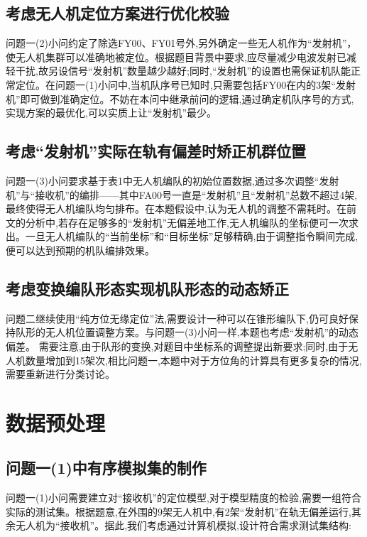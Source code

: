 \documentclass[withoutpreface,bwprint]{cumcmthesis}
\begin{document}
	\subsection{考虑无人机定位方案进行优化校验}
	
	问题一(2)小问约定了除选FY00、FY01号外,另外确定一些无人机作为“发射机”，使无人机集群可以准确地被定位。根据题目背景中要求,应尽量减少电波发射已减轻干扰,故另设信号“发射机”数量越少越好;同时,“发射机”的设置也需保证机队能正常定位。在问题一(1)小问中,当机队序号已知时,只需要包括FY00在内的3架“发射机”即可做到准确定位。不妨在本问中继承前问的逻辑,通过确定机队序号的方式,实现方案的最优化,可以实质上让“发射机”最少。
	
	\subsection{考虑“发射机”实际在轨有偏差时矫正机群位置}
	
	问题一(3)小问要求基于表1中无人机编队的初始位置数据,通过多次调整“发射机”与“接收机”的编排——其中FA00号一直是“发射机”且“发射机”总数不超过4架,最终使得无人机编队均匀排布。在本题假设中,认为无人机的调整不需耗时。在前文的分析中,若存在足够多的“发射机”无偏差地工作,无人机编队的坐标便可一次求出。一旦无人机编队的“当前坐标”和“目标坐标”足够精确,由于调整指令瞬间完成,便可以达到预期的机队编排效果。
	
	
	\subsection{考虑变换编队形态实现机队形态的动态矫正}
	
	问题二继续使用“纯方位无缘定位”法,需要设计一种可以在锥形编队下,仍可良好保持队形的无人机位置调整方案。与问题一(3)小问一样,本题也考虑“发射机”的动态偏差。%
	需要注意,由于队形的变换,对题目中坐标系的调整提出新要求;同时,由于无人机数量增加到15架次,相比问题一,本题中对于方位角的计算具有更多复杂的情况,需要重新进行分类讨论。
	
	
	\section{数据预处理}
	\subsection{问题一(1)中有序模拟集的制作}
	
	问题一(1)小问需要建立对“接收机”的定位模型,对于模型精度的检验,需要一组符合实际的测试集。根据题意,在外围的9架无人机中,有2架“发射机”在轨无偏差运行,其余无人机为“接收机”。据此,我们考虑通过计算机模拟,设计符合需求测试集结构:
	
\end{document}

